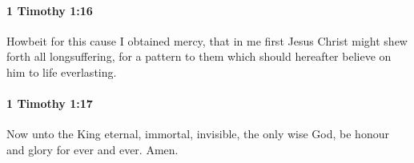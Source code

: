		\paragraph{1 Timothy 1:16} %
			\label{1TIMOTHY-1-16}

			Howbeit for this cause I obtained mercy, that in me first Jesus Christ might shew forth all longsuffering, for a pattern to them which should hereafter believe on him to life everlasting.

			\begin{framed}
			\scriptsize
				\begin{compactdesc}
					\item[SBLG] 
				\end{compactdesc}
			\end{framed}

		\paragraph{1 Timothy 1:17} %
			\label{1TIMOTHY-1-17}

			Now unto the King eternal, immortal, invisible, the only wise God, be honour and glory for ever and ever.  Amen.

